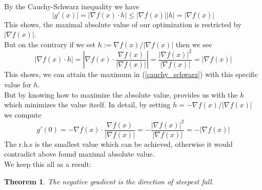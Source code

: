 \documentclass[17pt]{extarticle}
\newtheorem*{theorem*}{Theorem}
\begin{document}
By the Cauchy-Schwarz inequality we have
\begin{equation} \label{cauchy_schwarz}
|g'(x)|=|\nabla f(x)\cdot h|\leq |\nabla f(x)||h|=|\nabla f(x)|
\end{equation}
This shows, the maximal absolute value of our optimization is restricted by $|\nabla f(x)|$.\\
But on the contrary if we set $h:=\nabla f(x) / |\nabla f(x)|$ then we see
$$
|\nabla f(x)\cdot h|=\left|\nabla f(x)\cdot \frac{\nabla f(x)}{|\nabla f(x)|}\right|= \frac{|\nabla f(x)|^2}{|\nabla f(x)|}=|\nabla f(x)|
$$
This shows, we can attain the maximum in (\ref{cauchy_schwarz}) with this specific value for $h$.\\
But by knowing how to maximize the absolute value, provides us with the $h$ which minimizes the value itself. In detail, by setting $h=-\nabla f(x) / |\nabla f(x)|$ we compute
$$
g'(0)=-\nabla f(x)\cdot \frac{\nabla f(x)}{|\nabla f(x)|}=
- \frac{|\nabla f(x)|^2}{|\nabla f(x)|}=-|\nabla f(x)|
$$
The r.h.s is the smallest value which can be achieved, otherwise it would contradict above found maximal absolute value.\\
We keep this all as a result:
\begin{theorem*}
	The negative gradient is the direction of steepest fall.
\end{theorem*}
\end{document}
